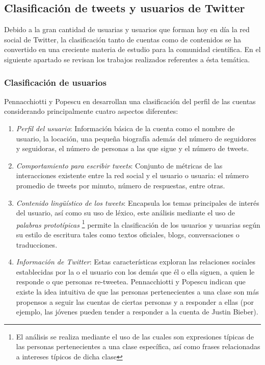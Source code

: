 \subsection{Clasificación de tweets y usuarios de Twitter}

Debido a la gran cantidad de usuarias y usuarios que forman hoy en día la red social de Twitter, la clasificación tanto de cuentas como de contenidos se ha convertido en una creciente materia de estudio para la comunidad científica. En el siguiente apartado se revisan los trabajos realizados referentes a ésta temática.

\subsubsection{Clasificación de usuarios}
   
     Pennacchiotti y Popescu en \cite{PennacchiottiP11} desarrollan una clasificación del perfil de las cuentas considerando principalmente cuatro aspectos diferentes:

    \begin{enumerate}
        \item \emph{Perfil del usuario}: Información básica de la cuenta como el nombre de usuario, la locación, una pequeña biografía además del número de seguidores y seguidoras, el número de personas a las que sigue  y el número de tweets. 
        
        \item \emph{Comportamiento para escribir tweets}:  Conjunto de métricas de las interacciones
        existente entre la red social y el usuario o usuaria: el número promedio de tweets por minuto, número de respuestas, entre otras. 
        
        \item \emph{Contenido lingüístico de los tweets}: Encapsula los temas principales de interés del usuario, así como su uso de léxico, este análisis mediante el uso de \emph{palabras prototípicas} \footnote{ El análisis se realiza mediante el uso de las cuales son expresiones típicas de las personas pertenecientes a una clase específica, así como frases relacionadas a intereses típicos de dicha clase} permite la clasificación de los usuarios y usuarias según su estilo de escritura tales como textos oficiales, blogs, conversaciones o traducciones.
       
        \item \emph{Información de Twitter}: Estas características exploran las relaciones sociales establecidas por
        la o el usuario con los demás que él o ella siguen, a quien le responde o que personas re-tweetea. Pennacchiotti y Popescu indican que existe la idea intuitiva de que las personas pertenecientes a una clase son más propensos a seguir las cuentas de ciertas personas y a responder a ellas (por ejemplo, las jóvenes pueden tender a responder a la cuenta de Justin Bieber).
       
    \end{enumerate}

